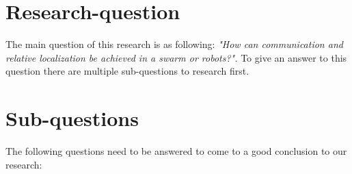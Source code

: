 \documentclass[10pt,a4paper]{article}
\begin{document}
\section{Research-question}

The main question of this research is as following: \textit{"How can communication and relative localization be achieved in a swarm or robots?".} To give an answer to this question there are multiple sub-questions to research first. 
 


\section{Sub-questions} 
The following questions need to be answered to come to a good conclusion to our research:

\begin{itemize}


\end{itemize}
\end{document}
